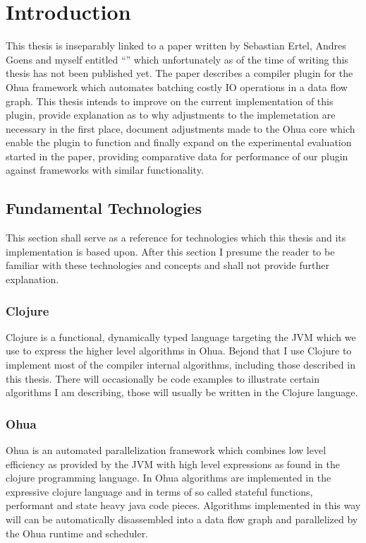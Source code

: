 \chapter{Introduction}

\label{ChapterIntro}

This thesis is inseparably linked to a paper written by Sebastian Ertel, Andres Goens and myself entitled ``\yauhauPaperTitle{}'' which unfortunately as of the time of writing this thesis has not been published yet.
The paper describes a compiler plugin for the Ohua framework which automates batching costly IO operations in a data flow graph.
This thesis intends to improve on the current implementation of this plugin, provide explanation as to why adjustments to the implemetation are necessary in the first place, document adjustments made to the Ohua core which enable the plugin to function and finally expand on the experimental evaluation started in the paper, providing comparative data for performance of our plugin against frameworks with similar functionality.

\section{Fundamental Technologies}

This section shall serve as a reference for technologies which this thesis and its implementation is based upon.
After this section I presume the reader to be familiar with these technologies and concepts and shall not provide further explanation.

\subsection{Clojure}

Clojure is a functional, dynamically typed language targeting the JVM  which we use to express the higher level algorithms in Ohua.
Bejond that I use Clojure to implement most of the compiler internal algorithms, including those described in this thesis.
There will occasionally be code examples to illustrate certain algorithms I am describing, those will usually be written in the Clojure language.

\subsection{Ohua}

Ohua is an automated parallelization framework which combines low level efficiency as provided by the JVM with high level expressions as found in the clojure programming language.
In Ohua algorithms are implemented in the expressive clojure language and in terms of so called stateful functions, performant and state heavy java code pieces.
Algorithms implemented in this way will can be automatically disassembled into a data flow graph and parallelized by the Ohua runtime and scheduler.
